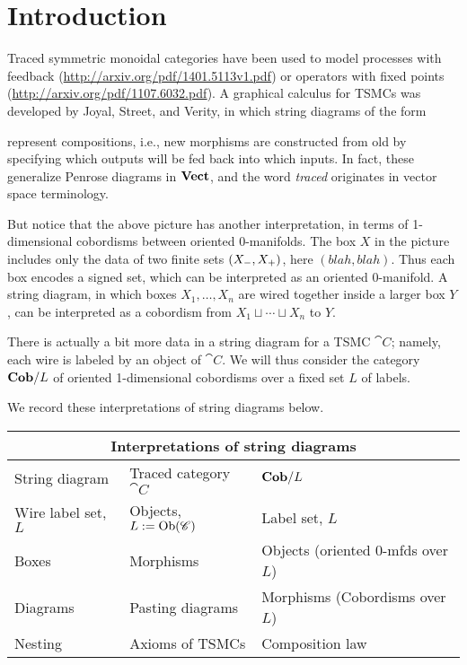 \chapter{Introduction}

Traced symmetric monoidal categories have been used to model processes with feedback (\url{http://arxiv.org/pdf/1401.5113v1.pdf})  or operators with fixed points (\url{http://arxiv.org/pdf/1107.6032.pdf}). A graphical calculus for TSMCs was developed by Joyal, Street, and Verity, in which string diagrams of the form
\begin{center}\end{center}
represent compositions, i.e., new morphisms are constructed from old by specifying which outputs will be fed back into which inputs. In fact, these generalize Penrose diagrams in $\mathbf{Vect}$, and the word \emph{traced} originates in vector space terminology.  

But notice that the above picture has another interpretation, in terms of 1-dimensional cobordisms between oriented 0-manifolds. The box $X$ in the picture includes only the data of two finite sets $({X_-},{X_+})$, here $(blah,blah)$. Thus each box encodes a signed set, which can be interpreted as an oriented 0-manifold. A string diagram, in which boxes $X_1,\ldots,X_n$ are wired together inside a larger box $Y$, can be interpreted as a cobordism from $X_1\sqcup\cdots\sqcup X_n$ to $Y$. 

There is actually a bit more data in a string diagram for a TSMC $\cat{C}$; namely, each wire is labeled by an object of $\cat{C}$. We will thus consider the category $\mathbf{Cob}/L$ of oriented 1-dimensional cobordisms over a fixed set $L$ of labels. 

We record these interpretations of string diagrams below.
\begin{center}
\begin{tabular}{| l | l | l |}
\hline
\multicolumn{3}{|c|}{Interpretations of string diagrams}\\\hline
String diagram & Traced category $\cat{C}$ & $\mathbf{Cob}/L$\\\bhline
Wire label set, $L$&Objects, $L:=\operatorname{Ob}(\mathscr{C})$&Label set, $L$\\
Boxes & Morphisms & Objects (oriented 0-mfds over $L$)\\
Diagrams & Pasting diagrams & Morphisms (Cobordisms over $L$)\\
Nesting & Axioms of TSMCs & Composition law\\\hline
\end{tabular}
\end{center}

